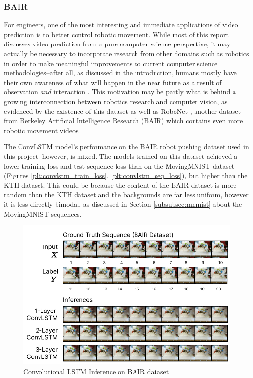 \documentclass{scrartcl}
\begin{document}
\subsubsection{BAIR}
\label{subsubsec:bair}

For engineers, one of the most interesting and immediate applications of video
prediction is to better control robotic movement. While most of this report
discusses video prediction from a pure computer science perspective, it may
actually be necessary to incorporate research from other domains such as
robotics in order to make meaningful improvements to current computer science
methodologies--after all, as discussed in the introduction, humans mostly have
their own awareness of what will happen in the near future as a result of
observation \textit{and} interaction \cite{human_learning_sequences}. This
motivation may be partly what is behind a growing interconnection between
robotics research and computer vision, as evidenced by the existence of this
dataset as well as RoboNet \cite{robonet_dataset}, another dataset from
Berkeley Artificial Intelligence Research (BAIR) which contains even more
robotic movement videos.

The ConvLSTM model's performance on the BAIR robot pushing dataset used in this
project, however, is mixed. The models trained on this dataset achieved a lower
training loss and test sequence loss than on the MovingMNIST dataset (Figures
\ref{plt:convlstm_train_loss}, \ref{plt:convlstm_seq_loss}), but higher than the KTH
dataset. This could be because the content of the BAIR dataset is more random
than the KTH dataset and the backgrounds are far less uniform, however it is
less directly bimodal, as discussed in Section \ref{subsubsec:mmnist} about the
MovingMNIST sequences.

\begin{figure}[H]
	\begin{center}
		\includegraphics[width=1\textwidth]{inferences/bair/bair_inferences.png}
	\end{center}
	\caption{Convolutional LSTM Inference on BAIR dataset}
	\label{inf:convlstm_bair_inference}
\end{figure}
\end{document}
